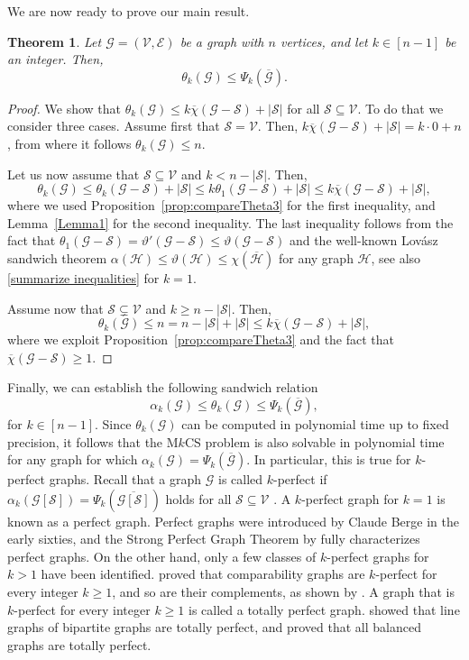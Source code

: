 \documentclass[11pt, a4paper]{article}
\newtheorem{theorem}{Theorem}[section]
\newcommand{\mc}{\mathcal}
\begin{document}
We are now ready to prove our main result.
\begin{theorem}
    Let $\mc{G}=(\mc{V},\mc{E})$ be a graph with $n$ vertices, and let $k \in [n-1]$ be an integer. Then, 
    $$\theta_k(\mc{G}) \leq  \Psi_k(\overline{\mc{G}}).$$
\end{theorem}
\begin{proof}
We show that $\theta_k(\mc{G}) \leq k  \overline{\chi}({\mc{G} -\mc{S}}) + |\mc{S}|$ for all $\mc{S} \subseteq \mc{V}$.
To do that we consider three cases.
Assume first that $\mc{S}=\mc{V}$. Then, $k \overline{\chi}({\mc{G}} -\mc{S}) + |\mc{S}| =  k\cdot 0 +n$, from where it follows $\theta_k(\mc{G}) \leq n$.

Let us now assume that $\mc{S}\subseteq \mc{V}$ and $k < n-|\mc{S}|$.
Then,
$$\theta_k(\mc{G}) \leq \theta_k(\mc{G} -\mc{S}) + |\mc{S}| 
\leq k    \theta_1(\mc{G} - \mc{S})  + |\mc{S}|
\leq k  \overline{\chi}({\mc{G} - \mc{S}}) + |\mc{S}|,$$
where we used Proposition~\ref{prop:compareTheta3} for the first inequality, and Lemma~\ref{Lemma1} for the second inequality. 
The last inequality follows from the fact that $\theta_1(\mc{G} -\mc{S}) = \vartheta'(\mc{G} -\mc{S}) \leq \vartheta(\mc{G} -\mc{S})$ and the well-known Lov\'asz sandwich theorem 
$\alpha(\mc{H})\leq \vartheta(\mc{H})\leq \chi (\overline{\mc{H}})$ for any graph $\mc{H}$, see also \eqref{summarize inequalities} for $k=1$.

Assume now that $\mc{S}\varsubsetneq \mc{V}$ and $k \geq n-|\mc{S}|$. Then,
$$\theta_k(\mc{G}) \leq n = n-|\mc{S}| + |\mc{S}| \leq k  \overline{\chi}({\mc{G} - \mc{S}}) + |\mc{S}|,$$
where we exploit Proposition~\ref{prop:compareTheta3} and the fact that $\overline{\chi}({\mc{G} - \mc{S}})\geq 1$.
\end{proof}

Finally, we can establish the following sandwich relation 
$$ \alpha_k(\mc{G}) \leq \theta_k(\mc{G}) \leq  \Psi_k(\overline{\mc{G}}),$$
for $k\in [n-1]$.
Since $\theta_k(\mc{G}) $ can be computed in polynomial time up to fixed precision, it follows  that the M$k$CS problem is also solvable in polynomial time for any graph for which $\alpha_k(\mc{G})= \Psi_k(\overline{\mc{G}})$.
In particular, this is true for $k$-perfect graphs. 
Recall that a graph $\mc{G}$ is called $k$-perfect if $\alpha_k ( \mc{G}[\mc{S}]) =  \Psi_k(\overline{\mc{G}[\mc{S}]})$ holds for all $\mc{S}\subseteq \mc{V}$ \cite{lovasz1983perfect}.
A $k$-perfect graph for $k=1$ is known as a perfect graph. 
Perfect graphs were introduced by Claude Berge in the early sixties, and the Strong Perfect Graph Theorem by \citet{Chudnovsky2006SPGT} fully characterizes perfect graphs.
On the other hand, only a few classes of $k$-perfect graphs for $k>1$ have been identified. 
\citet{GreeneKleitman1976} proved that comparability graphs are $k$-perfect for every integer $k\geq 1$, and so are their complements, as shown by \citet{Greene1976}. 
A graph that is $k$-perfect for every integer $k\geq 1$ is called a totally perfect graph.
\citet{lovasz1983perfect} showed that line graphs of bipartite graphs are totally perfect, and \citet{Berge1992} proved that all balanced graphs are totally perfect.
\end{document}
